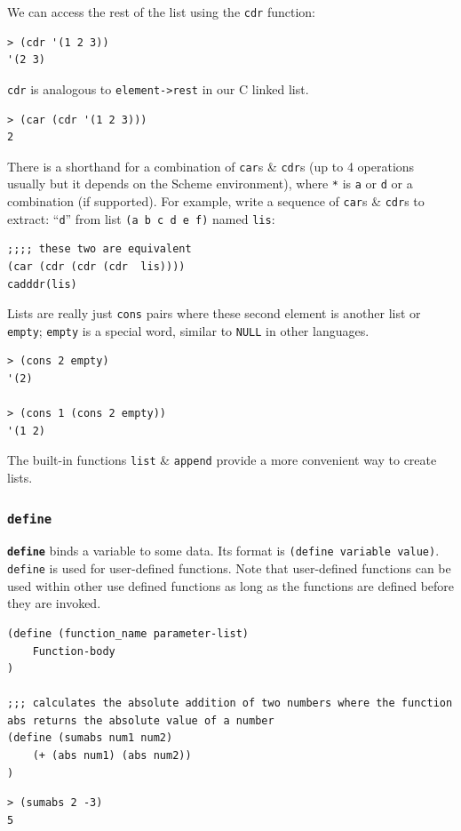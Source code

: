 \documentclass[a4paper,11pt]{article}
\begin{document}
We can access the rest of the list using the \verb|cdr| function:
\begin{verbatim}
> (cdr '(1 2 3))
'(2 3)
\end{verbatim}

\verb|cdr| is analogous to \verb|element->rest| in our C linked list.
\begin{verbatim}
> (car (cdr '(1 2 3)))
2
\end{verbatim}

There is a shorthand for a combination of \verb|car|s \& \verb|cdr|s (up to 4 operations usually but it depends 
on the Scheme environment), where  \verb|*| is \verb|a| or \verb|d| or a combination (if supported). 
For example, write a sequence of \verb|car|s \& \verb|cdr|s to extract: ``\verb|d|'' from list
\verb|(a b c d e f)| named \verb|lis|:
\begin{verbatim}
;;;; these two are equivalent
(car (cdr (cdr (cdr  lis))))
cadddr(lis)
\end{verbatim}

Lists are really just \verb|cons| pairs where these second element is another list or \verb|empty|;
\verb|empty| is a special word, similar to \verb|NULL| in other languages.
\begin{verbatim}
> (cons 2 empty)
'(2)

> (cons 1 (cons 2 empty))
'(1 2)
\end{verbatim}

The built-in functions \verb|list| \& \verb|append| provide a more convenient way to create lists.

\subsubsection{\texttt{define}}
\textbf{\texttt{define}} binds a variable to some data. 
Its format is \texttt{(define variable value)}.
\verb|define| is used for user-defined functions.
Note that user-defined functions can be used within other use defined functions as long as the functions are 
defined before they are invoked.
\begin{verbatim}
(define (function_name parameter-list)
    Function-body
)

;;; calculates the absolute addition of two numbers where the function abs returns the absolute value of a number
(define (sumabs num1 num2) 
    (+ (abs num1) (abs num2)) 
)
\end{verbatim}
\begin{verbatim}
> (sumabs 2 -3)
5
\end{verbatim}
\end{document}

